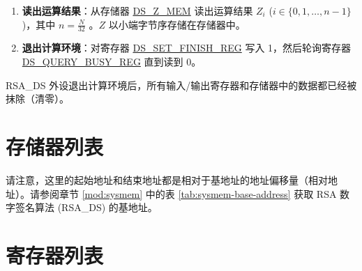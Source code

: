 \documentclass[main\_\_CN.tex]{subfiles}
\begin{document}
\begin{enumerate}
\begin{itemize}
        \item 如果返回值为 3，则说明填充填充校验失败，且 MD 校验失败。 这种情况说明有致命错误发生。\begin{math}Z\end{math} 结果值全零无效。跳至步骤 \ref{other:digsig-step-exit}。
        
    \end{itemize}
        
    \item {\bfseries 读出运算结果}：从存储器 \hyperref[DSZMEM]{DS\_Z\_MEM} 读出运算结果 \begin{math}Z_{i}\end{math} (\begin{math}i \in \{0,1, \dots,n-1\}\end{math})，其中 \begin{math} n = \frac{N}{32} \end{math} 。\begin{math}Z\end{math} 以小端字节序存储在存储器中。
    
    \item {\bfseries 退出计算环境\label{other:digsig-step-exit}}：对寄存器 \hyperref[regdesc:DSSETFINISHREG]{DS\_SET\_FINISH\_REG} 写入 1，然后轮询寄存器 \hyperref[regdesc:DSQUERYBUSYREG]{DS\_QUERY\_BUSY\_REG} 直到读到 0。

\end{enumerate}

RSA\_DS 外设退出计算环境后，所有输入/输出寄存器和存储器中的数据都已经被抹除（清零）。

\clearpage
\section{ 存储器列表 }
\label{sec:digsig-mem-summ}

请注意，这里的起始地址和结束地址都是相对于基地址的地址偏移量（相对地址）。请参阅章节 \ref{mod:sysmem} \textit{} 中的表 \ref{tab:sysmem-base-address} 获取 RSA 数字签名算法 (RSA\_DS) 的基地址。






\clearpage
\section{寄存器列表}
\label{sec:digsig-reg-summ}
\hypertarget{digsig-reg-summ}{}
\end{document}
